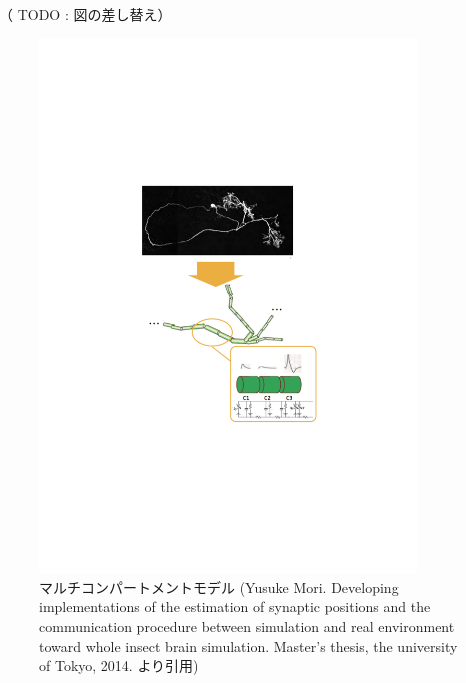 （ TODO : 図の差し替え）
\begin{figure}[htb]
 \begin{center}
    \includegraphics[width=10cm]{./images/multi-compartment.pdf}
    \caption{マルチコンパートメントモデル (Yusuke Mori. Developing implementations of the estimation of synaptic positions and the communication procedure between simulation and real environment toward whole insect brain simulation. Master's thesis, the university of Tokyo, 2014. より引用)}
    \label{fig:multi-compartment}
 \end{center}
\end{figure}
